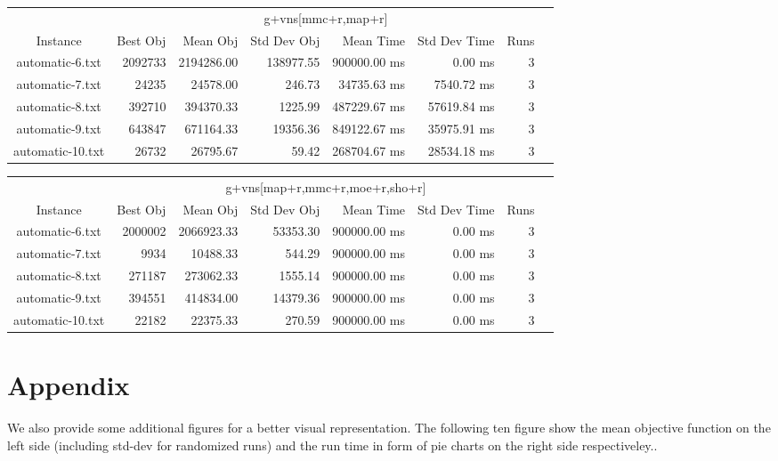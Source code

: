 \documentclass[11pt]{article}
\begin{document}
{\begin{tabular}{c|rrrrrrr}
                 & \multicolumn{6}{c}{g+vns[mmc+r,map+r]}                   \\
Instance         & Best Obj & Mean Obj   & Std Dev Obj & Mean Time    & Std Dev Time & Runs \\
\hline
automatic-6.txt  & 2092733  & 2194286.00 & 138977.55   & 900000.00 ms & 0.00 ms      & 3 \\
automatic-7.txt  & 24235    & 24578.00   & 246.73      & 34735.63 ms  & 7540.72 ms   & 3 \\
automatic-8.txt  & 392710   & 394370.33  & 1225.99     & 487229.67 ms & 57619.84 ms  & 3 \\
automatic-9.txt  & 643847   & 671164.33  & 19356.36    & 849122.67 ms & 35975.91 ms  & 3 \\
automatic-10.txt & 26732    & 26795.67   & 59.42       & 268704.67 ms & 28534.18 ms  & 3 \\
\end{tabular}

\vspace{0.5cm}

\begin{tabular}{c|rrrrrrr}
                 & \multicolumn{6}{c}{g+vns[map+r,mmc+r,moe+r,sho+r]}                   \\
Instance         & Best Obj & Mean Obj   & Std Dev Obj & Mean Time    & Std Dev Time & Runs \\
\hline
automatic-6.txt  & 2000002  & 2066923.33 & 53353.30    & 900000.00 ms & 0.00 ms      & 3 \\
automatic-7.txt  & 9934     & 10488.33   & 544.29      & 900000.00 ms & 0.00 ms      & 3 \\
automatic-8.txt  & 271187   & 273062.33  & 1555.14     & 900000.00 ms & 0.00 ms      & 3 \\
automatic-9.txt  & 394551   & 414834.00  & 14379.36    & 900000.00 ms & 0.00 ms      & 3 \\
automatic-10.txt & 22182    & 22375.33   & 270.59      & 900000.00 ms & 0.00 ms      & 3 \\
\end{tabular}
}

\section{Appendix}
We also provide some additional figures for a better visual representation.
The following ten figure show the mean objective function on the left side (including std-dev for randomized runs) and the run time in form of pie charts on the right side respectiveley..

\end{document}
